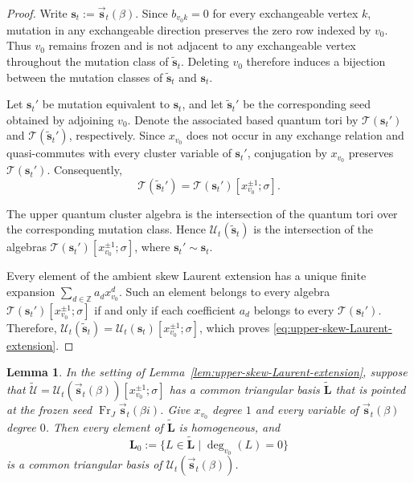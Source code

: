 \documentclass[12pt, reqno]{amsart}
\theoremstyle{plain}
\newtheorem{lemma}[theorem]{Lemma}
\theoremstyle{definition}
\numberwithin{equation}{section}
\newcommand{\ZZ}{\mathbb{Z}}
\begin{document}
\begin{proof}
Write \(\mathbf s_t:=\overrightarrow{\mathbf s}_t(\beta)\). Since
\(b_{v_0k}=0\) for every exchangeable vertex \(k\), mutation in any
exchangeable direction preserves the zero row indexed by \(v_0\).
Thus \(v_0\) remains frozen and is not adjacent to any exchangeable
vertex throughout the mutation class of
\(\widetilde{\mathbf s}_t\). Deleting \(v_0\) therefore induces a
bijection between the mutation classes of
\(\widetilde{\mathbf s}_t\) and \(\mathbf s_t\).

Let \(\mathbf s_t'\) be mutation equivalent to \(\mathbf s_t\), and
let \(\widetilde{\mathbf s}_t'\) be the corresponding seed obtained
by adjoining \(v_0\). Denote the associated based quantum tori by
\(\mathcal T(\mathbf s_t')\) and
\(\mathcal T(\widetilde{\mathbf s}_t')\), respectively. Since
\(x_{v_0}\) does not occur in any exchange relation and
quasi-commutes with every cluster variable of \(\mathbf s_t'\),
conjugation by \(x_{v_0}\) preserves
\(\mathcal T(\mathbf s_t')\). Consequently,
\begin{equation}\label{eq:cluster-torus-skew-extension}
    \mathcal T(\widetilde{\mathbf s}_t')
    =
    \mathcal T(\mathbf s_t')
    [x_{v_0}^{\pm1};\sigma].
\end{equation}

The upper quantum cluster algebra is the intersection of the quantum
tori over the corresponding mutation class. Hence
\(\mathcal U_t(\widetilde{\mathbf s}_t)\) is the intersection of the
algebras
\(\mathcal T(\mathbf s_t')[x_{v_0}^{\pm1};\sigma]\), where
\(\mathbf s_t'\sim\mathbf s_t\).

Every element of the ambient skew Laurent extension has a unique
finite expansion \(\sum_{d\in\ZZ}a_dx_{v_0}^d\). Such an element
belongs to every algebra
\(\mathcal T(\mathbf s_t')[x_{v_0}^{\pm1};\sigma]\) if and only if
each coefficient \(a_d\) belongs to every
\(\mathcal T(\mathbf s_t')\). Therefore,
\(\mathcal U_t(\widetilde{\mathbf s}_t)
=\mathcal U_t(\mathbf s_t)[x_{v_0}^{\pm1};\sigma]\), which proves
\eqref{eq:upper-skew-Laurent-extension}.
\end{proof}

\begin{lemma}\label{lem:degree-zero-triangular-basis}
In the setting of Lemma~\ref{lem:upper-skew-Laurent-extension}, suppose that
\(\widetilde{\mathcal U}
=\mathcal U_t(\overrightarrow{\mathbf s}_t(\beta))
[x_{v_0}^{\pm1};\sigma]\) has a common triangular basis
\(\widetilde{\mathbf L}\) that is pointed at the frozen seed $\operatorname{Fr}_{J}
\overrightarrow{\mathbf s}_t(\beta i)$. Give
\(x_{v_0}\) degree \(1\) and every variable of
\(\overrightarrow{\mathbf s}_t(\beta)\) degree \(0\). Then every element
of \(\widetilde{\mathbf L}\) is homogeneous, and
\begin{equation}\label{eq:degree-zero-common-triangular-basis}
    \mathbf L_0
    :=\{L\in\widetilde{\mathbf L}\mid\deg_{v_0}(L)=0\}
\end{equation}
is a common triangular basis of
\(\mathcal U_t(\overrightarrow{\mathbf s}_t(\beta))\).
\end{lemma}
\end{document}
